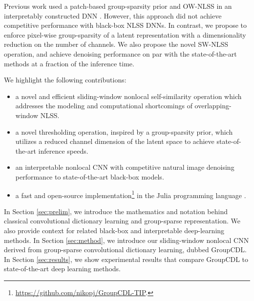 \documentclass[lettersize,journal]{IEEEtran}
\newcommand{\soa}{state-of-the-art }
\begin{document}
Previous work used a patch-based group-sparsity prior and OW-NLSS in an
interpretably constructed DNN \cite{lecouat2020nonlocal}. However, this approach
did not achieve competitive performance with black-box NLSS DNNs. In contrast,
we propose to enforce pixel-wise group-sparsity of a latent representation with a dimensionality reduction on the number of channels. We also propose the novel SW-NLSS operation, and achieve denoising
performance on par with the \soa methods at a fraction of the inference time. 

We highlight the following contributions:
\begin{itemize}
    \item a novel and efficient sliding-window nonlocal self-similarity
        operation which addresses the modeling and computational shortcomings of overlapping-window NLSS.
    \item a novel thresholding operation, inspired by a group-sparsity prior, which utilizes a reduced channel dimension of the latent space to achieve \soa inference speeds.
    \item an interpretable nonlocal CNN with competitive
        natural image denoising performance to \soa black-box models.
    \item a fast and open-source implementation\footnote{ 
        \href{https://github.com/nikopj/GroupCDL-TIP}{https://github.com/nikopj/GroupCDL-TIP}.
    } in the Julia programming language \cite{julia}.
\end{itemize}

In Section \ref{sec:prelim}, we introduce the mathematics and notation behind
classical convolutional dictionary learning and group-sparse representation. We
also provide context for related black-box and interpretable deep-learning
methods. In Section \ref{sec:method}, we introduce our sliding-window nonlocal
CNN derived from group-sparse convolutional dictionary learning, dubbed GroupCDL.
In Section \ref{sec:results}, we show experimental results that compare GroupCDL
to \soa deep learning methods.
\end{document}
